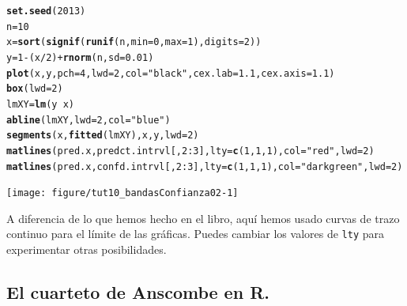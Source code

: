 \documentclass[10pt,a4paper]{article}\usepackage[]{graphicx}\usepackage[]{color}
\makeatletter
\newcommand{\hlnum}[1]{\textcolor[rgb]{0.686,0.059,0.569}{#1}}%
\newcommand{\hlstr}[1]{\textcolor[rgb]{0.192,0.494,0.8}{#1}}%
\newcommand{\hlopt}[1]{\textcolor[rgb]{0,0,0}{#1}}%
\newcommand{\hlstd}[1]{\textcolor[rgb]{0.345,0.345,0.345}{#1}}%
\newcommand{\hlkwb}[1]{\textcolor[rgb]{0.69,0.353,0.396}{#1}}%
\newcommand{\hlkwc}[1]{\textcolor[rgb]{0.333,0.667,0.333}{#1}}%
\newcommand{\hlkwd}[1]{\textcolor[rgb]{0.737,0.353,0.396}{\textbf{#1}}}%
\newenvironment{kframe}{%
 \def\at@end@of@kframe{}%
 \ifinner\ifhmode%
  \def\at@end@of@kframe{\end{minipage}}%
  \begin{minipage}{\columnwidth}%
 \fi\fi%
 \def\FrameCommand##1{\hskip\@totalleftmargin \hskip-\fboxsep
 \colorbox{shadecolor}{##1}\hskip-\fboxsep
     \hskip-\linewidth \hskip-\@totalleftmargin \hskip\columnwidth}%
 \MakeFramed {\advance\hsize-\width
   \@totalleftmargin\z@ \linewidth\hsize
   \@setminipage}}%
 {\par\unskip\endMakeFramed%
 \at@end@of@kframe}
\newenvironment{knitrout}{}{} %
\newcounter {cont01}
\makeatother
\begin{document}
\begin{knitrout}
\color{fgcolor}\begin{kframe}
\begin{alltt}
\hlkwd{set.seed}\hlstd{(}\hlnum{2013}\hlstd{)}
\hlstd{n}\hlkwb{=}\hlnum{10}
\hlstd{x} \hlkwb{=} \hlkwd{sort}\hlstd{(}\hlkwd{signif}\hlstd{(}\hlkwd{runif}\hlstd{(n,} \hlkwc{min}\hlstd{=}\hlnum{0}\hlstd{,} \hlkwc{max}\hlstd{=}\hlnum{1} \hlstd{),} \hlkwc{digits}\hlstd{=}\hlnum{2}\hlstd{) )}
\hlstd{y} \hlkwb{=} \hlnum{1} \hlopt{-} \hlstd{(x}\hlopt{/}\hlnum{2}\hlstd{)} \hlopt{+} \hlkwd{rnorm}\hlstd{(n,}\hlkwc{sd}\hlstd{=}\hlnum{0.01}\hlstd{)}
\hlkwd{plot}\hlstd{(x, y,} \hlkwc{pch}\hlstd{=}\hlnum{4}\hlstd{,} \hlkwc{lwd}\hlstd{=}\hlnum{2}\hlstd{,} \hlkwc{col}\hlstd{=}\hlstr{"black"}\hlstd{,} \hlkwc{cex.lab}\hlstd{=}\hlnum{1.1}\hlstd{,} \hlkwc{cex.axis}\hlstd{=}\hlnum{1.1}\hlstd{)}
\hlkwd{box}\hlstd{(}\hlkwc{lwd}\hlstd{=}\hlnum{2}\hlstd{)}
\hlstd{lmXY} \hlkwb{=} \hlkwd{lm}\hlstd{(y} \hlopt{~} \hlstd{x)}
\hlkwd{abline}\hlstd{(lmXY,} \hlkwc{lwd}\hlstd{=}\hlnum{2}\hlstd{,} \hlkwc{col}\hlstd{=}\hlstr{"blue"}\hlstd{)}
\hlkwd{segments}\hlstd{(x,}\hlkwd{fitted}\hlstd{(lmXY), x, y,} \hlkwc{lwd}\hlstd{=}\hlnum{2}\hlstd{)}
\hlkwd{matlines}\hlstd{(pred.x, predct.intrvl[ ,}\hlnum{2}\hlopt{:}\hlnum{3}\hlstd{],} \hlkwc{lty}\hlstd{=}\hlkwd{c}\hlstd{(}\hlnum{1}\hlstd{,} \hlnum{1}\hlstd{,} \hlnum{1}\hlstd{),} \hlkwc{col}\hlstd{=}\hlstr{"red"}\hlstd{,} \hlkwc{lwd}\hlstd{=}\hlnum{2}\hlstd{)}
\hlkwd{matlines}\hlstd{(pred.x, confd.intrvl[ ,}\hlnum{2}\hlopt{:}\hlnum{3}\hlstd{],} \hlkwc{lty}\hlstd{=}\hlkwd{c}\hlstd{(}\hlnum{1}\hlstd{,} \hlnum{1}\hlstd{,} \hlnum{1}\hlstd{),} \hlkwc{col}\hlstd{=}\hlstr{"darkgreen"}\hlstd{,} \hlkwc{lwd}\hlstd{=}\hlnum{2}\hlstd{)}
\end{alltt}
\end{kframe}
\texttt{[image: figure/tut10\_bandasConfianza02-1]} 

\end{knitrout}
A diferencia de lo que hemos hecho en el libro, aquí hemos usado curvas de trazo continuo para el límite de las gráficas. Puedes cambiar los valores de {\tt lty} para experimentar otras posibilidades.


\subsection{El cuarteto de Anscombe en R.}
\end{document}
